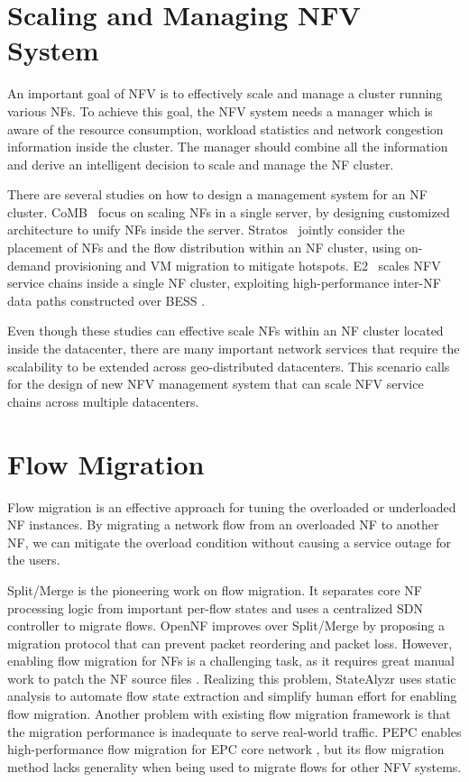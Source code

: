 \section{Scaling and Managing NFV System}

An important goal of NFV is to effectively scale and manage a cluster running various NFs. To achieve this goal, the NFV system needs a manager which is aware of the resource consumption, workload statistics and network congestion information inside the cluster. The manager should combine all the information and derive an intelligent decision to scale and manage the NF cluster.

There are several studies on how to design a management system for an NF cluster. CoMB~\cite{sekar2012design} focus on scaling NFs in a single server, by designing customized architecture to unify NFs inside the server. Stratos~\cite{gember2012stratos} jointly consider the placement of NFs and the flow distribution within an NF cluster, using on-demand provisioning and VM migration to mitigate hotspots. E2~\cite{palkar2015e2} scales NFV service chains inside a single NF cluster, exploiting high-performance inter-NF data paths constructed over BESS \cite{bess}.

Even though these studies can effective scale NFs within an NF cluster located inside the datacenter, there are many important network services that require the scalability to be extended across geo-distributed datacenters. This scenario calls for the design of new NFV management system that can scale NFV service chains across multiple datacenters.

\section {Flow Migration}

Flow migration is an effective approach for tuning the overloaded or underloaded NF instances. By migrating a network flow from an overloaded NF to another NF, we can mitigate the overload condition without causing a service outage for the users.

Split/Merge \cite{rajagopalan2013split} is the pioneering work on flow migration. It separates core NF processing logic from important per-flow states and uses a centralized SDN controller to migrate flows. OpenNF \cite{gember2015opennf} improves over Split/Merge by proposing a migration protocol that can prevent packet reordering and packet loss. However, enabling flow migration for NFs is a challenging task, as it requires great manual work to patch the NF source files \cite{gember2015opennf}. Realizing this problem, StateAlyzr \cite{khalid2016paving} uses static analysis to automate flow state extraction and simplify human effort for enabling flow migration. Another problem with existing flow migration framework is that the migration performance is inadequate to serve real-world traffic. PEPC \cite{qazi2017high} enables high-performance flow migration for EPC core network \cite{epc}, but its flow migration method lacks generality when being used to migrate flows for other NFV systems.


